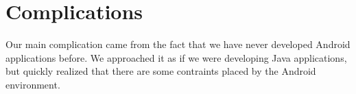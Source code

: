 \section*{Complications}

Our main complication came from the fact that we have never developed Android applications
  before.
We approached it as if we were developing Java applications, but quickly realized that 
  there are some contraints placed by the Android environment.
